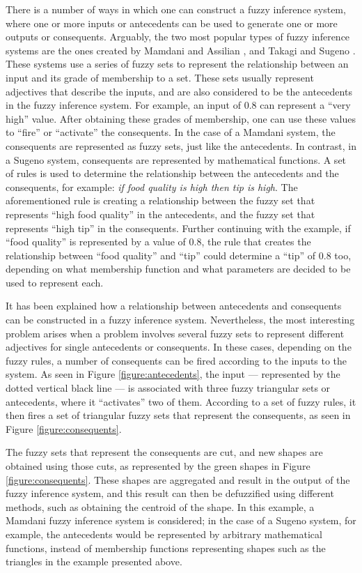 \documentclass[review]{elsarticle}
\begin{document}
There is a number of ways in which one can construct a fuzzy inference system,
where one or more inputs or antecedents can be used to generate one or more
outputs or consequents. Arguably, the two most popular types of fuzzy inference
systems are the ones created by Mamdani and Assilian \cite{Mamdani1975}, and
Takagi and Sugeno \cite{Takagi1985}. These systems use a series of fuzzy sets to
represent the relationship between an input and its grade of membership to a
set. These sets usually represent adjectives that describe the inputs, and are
also considered to be the antecedents in the fuzzy inference system. For
example, an input of 0.8 can represent a ``very high'' value. After obtaining
these grades of membership, one can use these values to ``fire'' or ``activate''
the consequents. In the case of a Mamdani system, the consequents are
represented as fuzzy sets, just like the antecedents. In contrast, in a Sugeno
system, consequents are represented by mathematical functions. A set of rules is
used to determine the relationship between the antecedents and the consequents,
for example: \textit{if food quality is high then tip is high}. The
aforementioned rule is creating a relationship between the fuzzy set that
represents ``high food quality'' in the antecedents, and the fuzzy set that
represents ``high tip'' in the consequents. Further continuing with the example,
if ``food quality'' is represented by a value of 0.8, the rule that creates the
relationship between ``food quality'' and ``tip'' could determine a ``tip'' of
0.8 too, depending on what membership function and what parameters are decided
to be used to represent each.

It has been explained how a relationship between antecedents and consequents can
be constructed in a fuzzy inference system. Nevertheless, the most interesting
problem arises when a problem involves several fuzzy sets to represent different
adjectives for single antecedents or consequents. In these cases, depending on
the fuzzy rules, a number of consequents can be fired according to the inputs to
the system. As seen in Figure \ref{figure:antecedents}, the input ---
represented by the dotted vertical black line --- is associated with three fuzzy
triangular sets or antecedents, where it ``activates'' two of them. According to
a set of fuzzy rules, it then fires a set of triangular fuzzy sets that
represent the consequents, as seen in Figure \ref{figure:consequents}.

The fuzzy sets that represent the consequents are cut, and new shapes are
obtained using those cuts, as represented by the green shapes in Figure
\ref{figure:consequents}. These shapes are aggregated and result in the output
of the fuzzy inference system, and this result can then be defuzzified using
different methods, such as obtaining the centroid of the shape. In this example,
a Mamdani fuzzy inference system is considered; in the case of a Sugeno system,
for example, the antecedents would be represented by arbitrary mathematical
functions, instead of membership functions representing shapes such as the
triangles in the example presented above.
\end{document}
